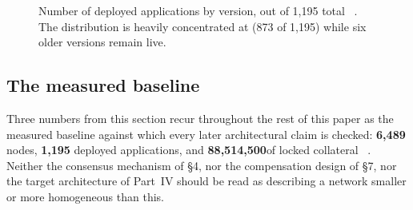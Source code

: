\begin{figure}[H]
\centering
{}
\caption{Number of deployed applications by \appspec version, out of 1,195 total
\shipped\ . The
distribution is heavily concentrated at  (873 of 1,195) while six older versions remain
live.}
\label{fig:appspec-versions}
\end{figure}

\subsection{The measured baseline}
\label{sec:deployed-today-baseline}

Three numbers from this section recur throughout the rest of this paper as the measured baseline
against which every later architectural claim is checked: \textbf{6,489} nodes, \textbf{1,195}
deployed applications, and \textbf{88,514,500}\flux of locked collateral
\shipped\ . Neither the consensus mechanism of \S4, nor
the compensation design of \S7, nor the target architecture of Part~IV should be read as
describing a network smaller or more homogeneous than this.

\FloatBarrier
